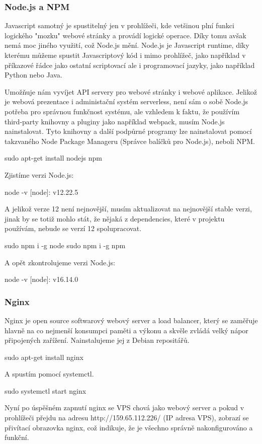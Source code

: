 \documentclass[12pt,a4paper]{report}
\begin{document}
  \subsubsection{Node.js a NPM}
  Javascript samotný je spustitelný jen v prohlížeči, kde vetšinou plní funkci logického "mozku" webové stránky a provádí logické operace. Díky tomu avšak nemá moc jiného využití, což Node.js mění.
  Node.js je Javascript runtime, díky kterému můžeme spustit Javascriptový kód i mimo prohlížeč, jako například v příkazové řádce jako ostatní scriptovací ale i programovací jazyky, jako například Python nebo Java.
 
  Umožňuje nám vyvíjet API servery pro webové stránky i webové aplikace. 
  Jelikož je webová prezentace i administační systém serverless, není sám o sobě Node.js potřeba pro správnou funkčnost systému, ale vzhledem k faktu, že
  používím third-party knihovny a pluginy jako například webpack, musím Node.js nainstalovat. Tyto knihovny a další podpůrné programy lze nainstalovat pomocí takzvaného Node Package Manageru (Správce balíčků pro Node.js), neboli NPM.
  \begin{bash}
    sudo apt-get install nodejs npm
  \end{bash}
  Zjistíme verzi Node.js:
  \begin{bash}
    node -v
    [node]: v12.22.5
  \end{bash}
  A jelikož verze 12 není nejnovější, musím aktualizovat na nejnovější stable verzi, jinak by se totiž mohlo stát, že nějaká z dependencies, které v projektu používám, nebude se verzí 12 spolupracovat.
  \begin{bash}
    sudo npm i -g node
    sudo npm i -g npm
  \end{bash}
  A opět zkontrolujeme verzi Node.js:
  \begin{bash}
    node -v
    [node]: v16.14.0
  \end{bash}
  \subsubsection{Nginx}
  Nginx je open source softwarový webový server a load balancer, který se zaměřuje hlavně na co
  nejmenší konsumpci paměti a výkonu a skvěle zvládá velký nápor připojených zařížení.
  Nainstalujeme jej z Debian repositářů.
  \begin{bash}
    sudo apt-get install nginx
  \end{bash}
  A spustím pomocí systemctl.
  \begin{bash}
    sudo systemctl start nginx
  \end{bash}
  Nyní po úspěšném zapnutí nginx se VPS chová jako webový server a pokud v prohlížeči přejdu na adresu http://159.65.112.226/ (IP adresa VPS), zobrazí se přivítací obrazovka nginx, což indikuje, že je všechno správně nakonfigurováno a funkční. 
  
\end{document}
